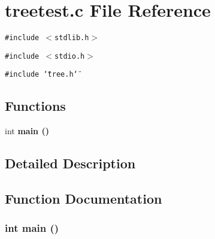 \section{treetest.c File Reference}
\label{treetest_8c}
{\tt \#include $<$stdlib.h$>$}\par
{\tt \#include $<$stdio.h$>$}\par
{\tt \#include \char`\"{}tree.h\char`\"{}}\par
\subsection*{Functions}
\begin{CompactItemize}
\item 
int \bf{main} ()
\end{CompactItemize}


\subsection{Detailed Description}


\subsection{Function Documentation}
\subsubsection{\setlength{\rightskip}{0pt plus 5cm}int main ()}\label{treetest_8c_446c6b9a1a4dbab517fbb760870458a3}


